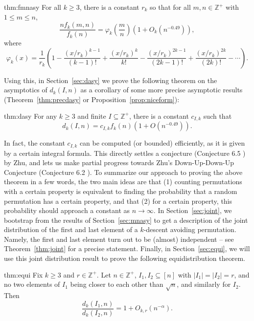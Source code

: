 \documentclass{amsart}
\theoremstyle{definition}
\begin{document}
\begin{reptheorem}{thm:fmnasy}
For all $k\geq 3$, there is a constant $r_k$ so that for all $m,n\in \mathbb{Z}^+$ with $1\leq m\leq n$,
\[\frac{nf_k(m,n)}{f_k(n)}=\varphi_k\left(\frac{m}{n}\right)\left(1+O_k\left(n^{-0.49}\right)\right),\]
where 
\[\varphi_k\left(x\right)=\frac{1}{r_k}\left(1-\frac{(x/r_k)^{k-1}}{(k-1)!}+\frac{(x/r_k)^k}{k!}-\frac{(x/r_k)^{2k-1}}{(2k-1)!}+\frac{(x/r_k)^{2k}}{(2k)!}-\cdots \right).\]
\end{reptheorem}

Using this, in Section~\ref{sec:dasy} we prove the following theorem on the asymptotics of $d_k(I,n)$ as a corollary of some more precise asymptotic results (Theorem~\ref{thm:precdasy} or Proposition~\ref{prop:niceform}):

\begin{reptheorem}{thm:dasy}
For any $k\geq 3$ and finite $I\subseteq \mathbb{Z}^+$, there is a constant $c_{I,k}$ such that
\[d_k(I,n)=c_{I,k} f_k(n)\left(1+O(n^{-0.49})\right).\]
\end{reptheorem}
In fact, the constant $c_{I,k}$ can be computed (or bounded) efficiently, as it is given by a certain integral formula. This directly settles a conjecture (Conjecture 6.5 \cite{zhu2019enumerating}) by Zhu, and lets us make partial progress towards Zhu's Down-Up-Down-Up Conjecture (Conjecture 6.2 \cite{zhu2019enumerating}). To summarize our approach to proving the above theorem in a few words, the two main ideas are that (1) counting permutations with a certain property is equivalent to finding the probability that a random permutation has a certain property, and that (2) for a certain property, this probability should approach a constant as $n\to \infty$. In Section~\ref{sec:joint}, we bootstrap from the results of Section~\ref{sec:mnasy} to get a description of the joint distribution of the first and last element of a $k$-descent avoiding permutation. Namely, the first and last element turn out to be (almost) independent -- see Theorem~\ref{thm:joint} for a precise statement. Finally, in Section~\ref{sec:equi}, we will use this joint distribution result to prove the following equidistribution theorem.

\begin{reptheorem}{thm:equi}
Fix $k\geq 3$ and $r\in \mathbb{Z}^+$. Let $n\in \mathbb{Z}^+$, $I_1,I_2\subseteq [n]$ with $|I_1|=|I_2|=r$, and no two elements of $I_1$ being closer to each other than $\sqrt{n}$, and similarly for $I_2$. Then 
\[\frac{d_k(I_1,n)}{d_k(I_2,n)}=1+O_{k,r}\left(n^{-\alpha}\right).\]
\end{reptheorem}
\end{document}
